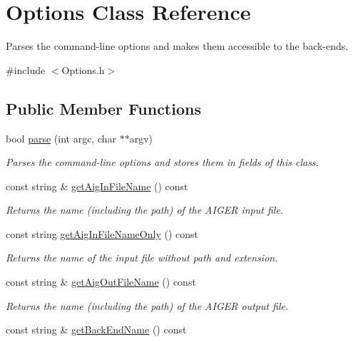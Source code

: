 \hypertarget{classOptions}{\section{Options Class Reference}
\label{classOptions}
}


Parses the command-\/line options and makes them accessible to the back-\/ends.  




{\ttfamily \#include $<$Options.\-h$>$}

\subsection*{Public Member Functions}
\begin{DoxyCompactItemize}
\item 
bool \hyperlink{classOptions_ade5d49fc467ba040926341daa1d9a06f}{parse} (int argc, char $\ast$$\ast$argv)
\begin{DoxyCompactList}\small\item\em Parses the command-\/line options and stores them in fields of this class. \end{DoxyCompactList}\item 
const string \& \hyperlink{classOptions_aaf9b09b226b91d4c2f9830624fd4182f}{get\-Aig\-In\-File\-Name} () const 
\begin{DoxyCompactList}\small\item\em Returns the name (including the path) of the A\-I\-G\-E\-R input file. \end{DoxyCompactList}\item 
const string \hyperlink{classOptions_a12a5530c59af8733b977434126ec36c6}{get\-Aig\-In\-File\-Name\-Only} () const 
\begin{DoxyCompactList}\small\item\em Returns the name of the input file without path and extension. \end{DoxyCompactList}\item 
const string \& \hyperlink{classOptions_ad7c543adeab5d10177f3a7a279f807e1}{get\-Aig\-Out\-File\-Name} () const 
\begin{DoxyCompactList}\small\item\em Returns the name (including the path) of the A\-I\-G\-E\-R output file. \end{DoxyCompactList}\item 
const string \& \hyperlink{classOptions_a2b7a4169cf0f3366e5035ec5b497e585}{get\-Back\-End\-Name} () const 
$$
\end{DoxyCompactItemize}
